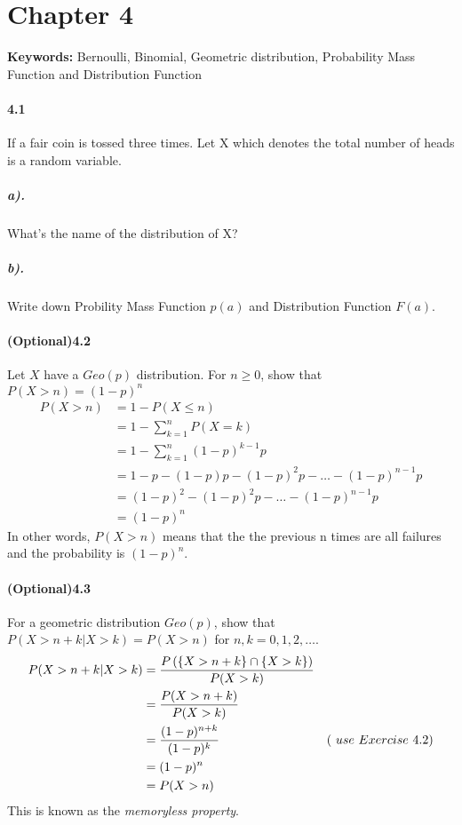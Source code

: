 \documentclass[11pt]{article} %
\begin{document}
\section{Chapter 4}
\textbf{Keywords: } Bernoulli, Binomial, Geometric distribution, Probability Mass Function and Distribution Function
\paragraph*{4.1} If a fair coin is tossed three times. Let X which denotes the total number of heads is a random variable. 
\subparagraph*{a).} What's the name of the distribution of X?
\subparagraph*{b).} Write down Probility Mass Function $p(a)$ and Distribution Function $F(a)$.

\paragraph*{(Optional)4.2} Let $X$ have a $Geo(p)$ distribution. For $n \geq 0$, show that $P(X > n) = (1-p)^n$
\begin{align*}
P( X > n) &  = 1 - P(X \leq n) \\
& = 1 - \sum_{k=1}^n P(X=k) \\
& = 1 - \sum_{k=1}^n (1-p)^{k-1}p \\
& = 1 - p - (1-p)p - (1-p)^2p - \ldots - (1-p)^{n-1}p \\
& = (1-p)^2 - (1-p)^2p - \ldots - (1-p)^{n-1}p \\
& = (1-p)^n 
\end{align*}
In other words, $P(X>n)$ means that the the previous n times are all failures and the probability is $(1-p)^n$. 

\paragraph*{(Optional)4.3} For a geometric distribution $Geo(p)$, show that $P(X> n + k | X > k) = P(X > n)$ for $n, k = 0, 1, 2, \ldots$. 
\begin{align*}
P(X> n + k | X > k) & = \frac{P \left( \{X > n + k\}\cap \{X > k\}\right) }{P(X > k)} & \\
& = \frac{P(X > n + k)}{P(X > k)} & \\
& = \frac{(1-p)^{n+k}}{(1-p)^k}& \text(\ use\  Exercise\ 4.2) \\
& = (1-p)^n & \\
& = P(X>n)
\end{align*}
This is known as the {\it memoryless property}. 
\end{document}
